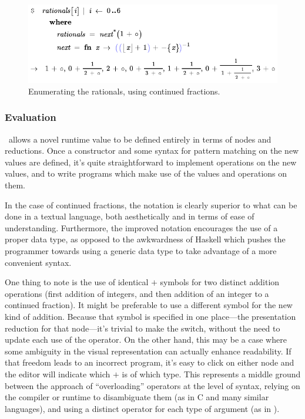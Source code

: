 
\begin{figure}[t]
  \centering
    
  \includegraphics[scale=0.6]{src/image/rationals2.pdf}
  
  \caption{Enumerating the rationals, using continued fractions.}
  \label{fig-rationals}
\end{figure}

\subsubsection{Evaluation}
\Meta\ allows a novel runtime value to be defined entirely in terms of nodes and reductions. Once a constructor and some syntax for pattern matching on the new values are defined, it's quite straightforward to implement operations on the new values, and to write programs which make use of the values and operations on them.

In the case of continued fractions, the notation is clearly superior to what can be done in a textual language, both aesthetically and in terms of ease of understanding. Furthermore, the improved notation encourages the use of a proper data type, as opposed to the awkwardness of Haskell which pushes the programmer towards using a generic data type to take advantage of a more convenient syntax.

One thing to note is the use of identical $+$ symbols for two distinct addition operations (first addition of integers, and then addition of an integer to a continued fraction). It might be preferable to use a different symbol for the new kind of addition. Because that symbol is specified in one place---the presentation reduction for that node---it's trivial to make the switch, without the need to update each use of the operator. On the other hand, this may be a case where some ambiguity in the visual representation can actually enhance readability. If that freedom leads to an incorrect program, it's easy to click on either node and the editor will indicate which $+$ is of which type. This represents a middle ground between the approach of ``overloading'' operators at the level of syntax, relying on the compiler or runtime to disambiguate them (as in C and many similar languages), and using a distinct operator for each type of argument (as in ).

